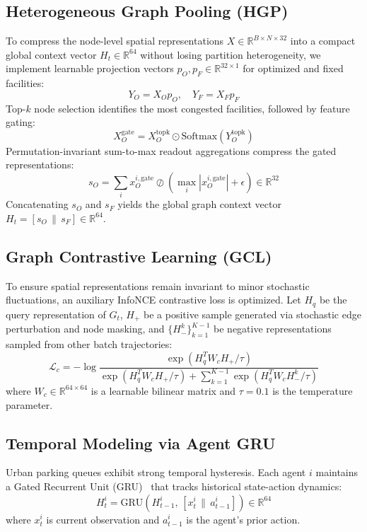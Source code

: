 \documentclass[journal]{IEEEtran}
\begin{document}
\subsection{Heterogeneous Graph Pooling (HGP)}
To compress the node-level spatial representations $X \in \mathbb{R}^{B \times N \times 32}$ into a compact global context vector $H_t \in \mathbb{R}^{64}$ without losing partition heterogeneity, we implement learnable projection vectors $p_O, p_F \in \mathbb{R}^{32 \times 1}$ for optimized and fixed facilities:
\begin{equation}
Y_O = X_O p_O, \quad Y_F = X_F p_F
\end{equation}
Top-$k$ node selection identifies the most congested facilities, followed by feature gating:
\begin{equation}
X_O^{\text{gate}} = X_O^{\text{topk}} \odot \text{Softmax}(Y_O^{\text{topk}})
\end{equation}
Permutation-invariant sum-to-max readout aggregations compress the gated representations:
\begin{equation}
s_O = \sum_{i} x_O^{i, \text{gate}} \oslash \left(\max_{i} |x_O^{i, \text{gate}}| + \epsilon\right) \in \mathbb{R}^{32}
\end{equation}
Concatenating $s_O$ and $s_F$ yields the global graph context vector $H_t = [s_O \,\|\, s_F] \in \mathbb{R}^{64}$.

\subsection{Graph Contrastive Learning (GCL)}
To ensure spatial representations remain invariant to minor stochastic fluctuations, an auxiliary InfoNCE contrastive loss is optimized. Let $H_q$ be the query representation of $G_t$, $H_+$ be a positive sample generated via stochastic edge perturbation and node masking, and $\{H_-^k\}_{k=1}^{K-1}$ be negative representations sampled from other batch trajectories:
\begin{equation}
\mathcal{L}_c = -\log \frac{\exp\left(H_q^T W_c H_+ / \tau\right)}{\exp\left(H_q^T W_c H_+ / \tau\right) + \sum_{k=1}^{K-1} \exp\left(H_q^T W_c H_-^k / \tau\right)}
\label{eq:infonce}
\end{equation}
where $W_c \in \mathbb{R}^{64 \times 64}$ is a learnable bilinear matrix and $\tau = 0.1$ is the temperature parameter.

\subsection{Temporal Modeling via Agent GRU}
Urban parking queues exhibit strong temporal hysteresis. Each agent $i$ maintains a Gated Recurrent Unit (GRU)~\cite{cho2014learning} that tracks historical state-action dynamics:
\begin{equation}
H_t^i = \text{GRU}\left(H_{t-1}^i, \, [x_t^i \,\|\, a_{t-1}^i]\right) \in \mathbb{R}^{64}
\label{eq:gru}
\end{equation}
where $x_t^i$ is current observation and $a_{t-1}^i$ is the agent's prior action.
\end{document}
